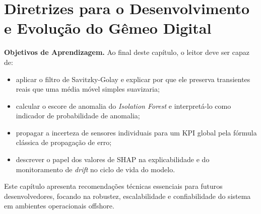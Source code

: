 \documentclass[12pt,a4paper]{article}
\numberwithin{equation}{section}
\numberwithin{table}{section}
\numberwithin{figure}{section}
\begin{document}
	\clearpage
	\section{Diretrizes para o Desenvolvimento e Evolução do Gêmeo Digital}

	\textbf{Objetivos de Aprendizagem.} Ao final deste capítulo, o leitor
	deve ser capaz de:
	\begin{itemize}
		\item aplicar o filtro de Savitzky-Golay e explicar por que ele
		preserva transientes reais que uma média móvel simples
		suavizaria;
		\item calcular o escore de anomalia do \textit{Isolation Forest}
		e interpretá-lo como indicador de probabilidade de anomalia;
		\item propagar a incerteza de sensores individuais para um KPI
		global pela fórmula clássica de propagação de erro;
		\item descrever o papel dos valores de SHAP na explicabilidade e
		do monitoramento de \textit{drift} no ciclo de vida do modelo.
	\end{itemize}

	Este capítulo apresenta recomendações técnicas essenciais para futuros desenvolvedores, focando na robustez, escalabilidade e confiabilidade do sistema em ambientes operacionais offshore.
	
\end{document}
